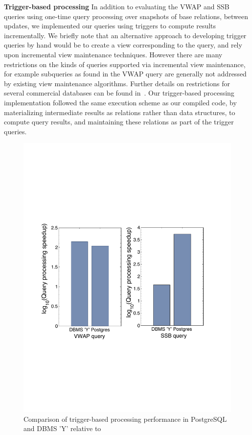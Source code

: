 \textbf{Trigger-based processing}
In addition to evaluating the VWAP and SSB queries using one-time query
processing over snapshots of base relations, between updates, we implemented our
queries using triggers to compute results incrementally. We briefly note that an
alternative approach to developing trigger queries by hand would be to create a
view corresponding to the query, and rely upon incremental view maintenance
techniques. However there are many restrictions on the kinds of queries supported
via incremental view maintenance, for example subqueries as found in the VWAP
query are generally not addressed by existing view maintenance algorithms.
Further details on restrictions for several commercial databases can be found
in~\cite{mssql-viewrestrict,db2-viewrestrict,oracle-viewrestrict}. Our
trigger-based processing implementation followed the same execution scheme as our
compiled code, by materializing intermediate results as relations rather than
data structures, to compute query results, and maintaining these relations as
part of the trigger queries.

\begin{figure}[tb]
\hspace{-5mm}
\includegraphics[scale=0.45]{../plots/trigger_comparison.pdf}
\caption{Comparison of trigger-based processing performance in PostgreSQL and
DBMS 'Y' relative to \compiler}
\label{fig:triggercomp}
\end{figure}

